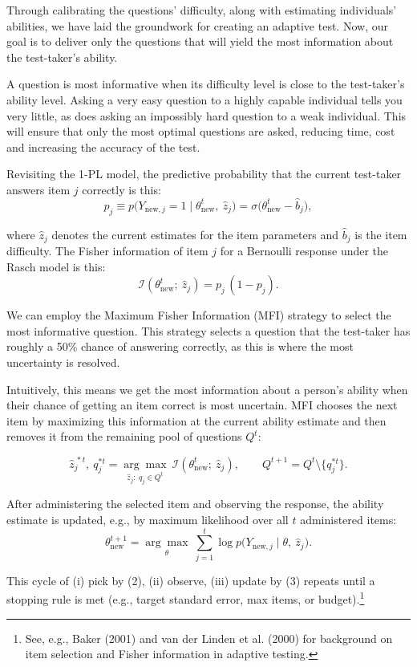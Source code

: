 \documentclass{article}
\begin{document}
Through calibrating the questions' difficulty, along with estimating individuals' abilities, we have laid the groundwork for creating an adaptive test. Now, our goal is to deliver only the questions that will yield the most information about the test-taker's ability.

A question is most informative when its difficulty level is close to the test-taker's ability level. Asking a very easy question to a highly capable individual tells you very little, as does asking an impossibly hard question to a weak individual. This will ensure that only the most optimal questions are asked, reducing time, cost and increasing the accuracy of the test.

Revisiting the 1-PL model, the predictive probability that the current test-taker answers item $j$ correctly is this:
\[
p_j \equiv p\big(Y_{\text{new},j}=1\mid \theta^{t}_{\text{new}},\ \hat z_j\big)
= \sigma\big(\theta^{t}_{\text{new}} - \hat b_j\big),
\]

where $\hat z_j$ denotes the current estimates for the item parameters and $\hat b_j$ is the item difficulty. The Fisher information of item $j$ for a Bernoulli response under the Rasch model is this:
\[
\mathcal I\!\left(\theta^{t}_{\text{new}};\ \hat z_j\right)
= p_j\,(1-p_j).
\tag{1}
\]

We can employ the Maximum Fisher Information (MFI) strategy to select the most informative question. This strategy selects a question that the test-taker has roughly a 50\% chance of answering correctly, as this is where the most uncertainty is resolved.

Intuitively, this means we get the most information about a person's ability when their chance of getting an item correct is most uncertain. MFI chooses the next item by maximizing this information at the current ability estimate and then removes it from the remaining pool of questions $Q^t$:

\[
\hat z^{\,*t}_j,\ q^{*t}_j
= \underset{\hat z_j:\ q_j\in Q^t}{\arg\max}\ \mathcal I\!\left(\theta^{t}_{\text{new}};\ \hat z_j\right),
\qquad
Q^{t+1} = Q^t\setminus\{q^{*t}_j\}.
\tag{2}
\]

After administering the selected item and observing the response, the ability estimate is
updated, e.g., by maximum likelihood over all $t$ administered items:
\[
\theta^{t+1}_{\text{new}}
= \underset{\theta}{\arg\max}\ \sum_{j=1}^{t} \log p\big(Y_{\text{new},j}\mid \theta,\ \hat z_j\big).
\tag{3}
\]

This cycle of (i) pick by (2), (ii) observe, (iii) update by (3) repeats until a stopping
rule is met (e.g., target standard error, max items, or budget).\footnote{See, e.g.,
Baker (2001) and van der Linden et al. (2000) for background on item selection and Fisher
information in adaptive testing.}
\end{document}
